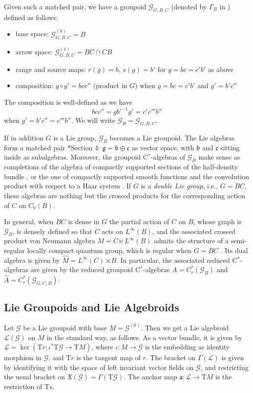 \documentclass[a4paper,11pt]{amsart}
\newcommand{\s}[1]{\mathcal{#1}}
\newcommand{\fr}[1]{\mathfrak{#1}}
\newcommand{\sm}[1]{\mathsf{#1}}
\newcommand{\rT}{\mathrm T}
\theoremstyle{definition}
\theoremstyle{remark}
\begin{document}
Given such a matched pair, we have a groupoid $\s{G}_{G, B, C}$ (denoted by $\Gamma_B$ in \cite{MR3681683})
defined as follows:
\begin{itemize}
\item base space: $\s{G}_{G, B, C}^{(0)} = B$
\item arrow space: $\s{G}_{G, B, C}^{(1)} = B C \cap C B$
\item range and source maps: $r(g) = b$, $s(g) = b'$ for $g = b c = c' b'$ as above
\item composition: $g \circ g' = b c c''$ (product in $G$) when $g = b c = c' b'$ and $g' = b' c''$
\end{itemize}
The composition is well-defined as we have
\[
b c c'' = g b'^{-1} g' = c' c''' b''
\]
when $g' = b' c'' = c''' b''$.
We will write $\s{G}_B = \s{G}_{G, B, C}$.

If in addition $G$ is a Lie group, $\s{G}_B$ becomes a Lie groupoid.
The Lie algebras form a matched pair \cite{MR1045735}*{Section 4}: $\fr{g} = \fr{b} \oplus \fr{c}$ as vector space, with $\fr b$ and $\fr c$ sitting inside as subalgebras.
Moreover, the groupoid C$^*$-algebras of $\s{G}_B$ make sense as completions of the algebra of compactly supported sections of the half-density bundle \cite{MR636521}, or the one of compactly supported smooth functions and the convolution product with respect to a Haar system \cite{MR1855249}.
If $G$ is a \emph{double Lie group}, i.e., $G = B C$, these algebras are nothing but the crossed products for the corresponding action of $C$ on $C_0(B)$.

In general, when $B C$ is dense in $G$ the partial action of $C$ on $B$, whose graph is $\s{G}_B$, is densely defined so that $C$ acts on $L^\infty(B)$, and the associated crossed product von Neumann algebra $M = C \ltimes L^\infty(B)$ admits the structure of a semi-regular locally compact quantum group, which is regular when $G = B C$ \cite{MR1969723}.
Its dual algebra is given by $\hat{M} = L^\infty(C) \rtimes B$.
In particular, the associated reduced C$^*$-algebras are given by the reduced groupoid C$^*$-algebras $A = C^*_r(\s{G}_B)$ and $\hat{A} = C^*_r(\s{G}_{G, C, B})$.

\subsection{Lie Groupoids and Lie Algebroids}
\label{sec:lie-grpd-lie-algbd}

Let $\s{G}$ be a Lie groupoid with base $M = \s{G}^{(0)}$.
Then we get a Lie algebroid $\s{L}(\s{G})$ on $M$ in the standard way, as follows.
As a vector bundle, it is given by $\s{L} = \ker(\rT r \colon \iota^* \rT \s{G} \to \rT M)$, where $\iota\colon M \to \s G$ is the embedding as identity morphism in $\s{G}$, and $\rT r$ is the tangent map of $r$.
The bracket on $\Gamma(\s{L})$ is given by identifying it with the space of left invariant vector fields on $\s{G}$, and restricting the usual bracket on $\fr{X}(\s{G}) = \Gamma(\rT \s{G})$.
The anchor map $\sm{a}\colon \s{L} \to \rT M$ is the restriction of $\rT s$.
\end{document}
